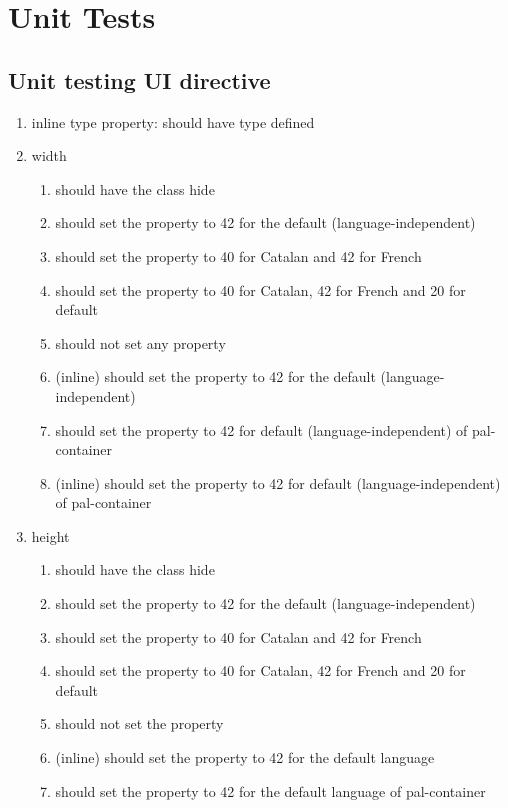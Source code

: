 \chapter{Unit Tests}
\label{chap:app-unittests}
\begin{singlespace}

\section{Unit testing UI directive}
\begin{enumerate}
\item     inline type property: should have type defined
\item     width
\begin{enumerate}
\item         should have the class hide
\item         should set the property to 42 for the default (language-independent)
\item         should set the property to 40 for Catalan and 42 for French
\item         should set the property to 40 for Catalan, 42 for French and 20 for default
\item         should not set any property
\item         (inline) should set the property to 42 for the default (language-independent)
\item         should set the property to 42 for default (language-independent) of pal-container
\item         (inline) should set the property to 42 for default (language-independent) of pal-container
\end{enumerate}
\item     height
\begin{enumerate}
\item         should have the class hide
\item         should set the property to 42 for the default (language-independent)
\item         should set the property to 40 for Catalan and 42 for French
\item         should set the property to 40 for Catalan, 42 for French and 20 for default
\item         should not set the property
\item         (inline) should set the property to 42 for the default language
\item         should set the property to 42 for the default language of pal-container

\end{enumerate}
\end{enumerate}
\end{singlespace}
